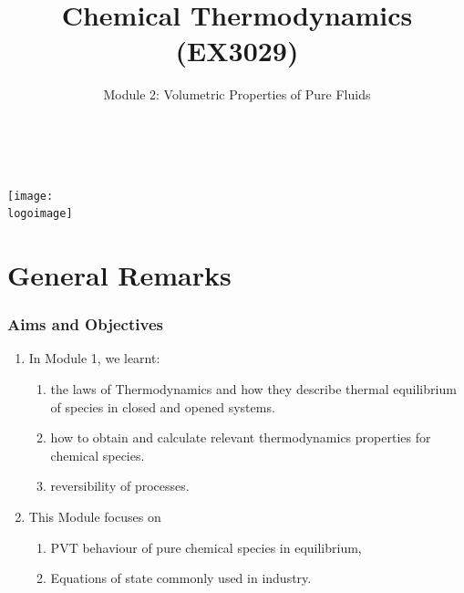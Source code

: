 \documentclass[10pt,compress]{beamer}
\institute{School of Engineering}
\title{Chemical Thermodynamics (EX3029)}
\subtitle{Module 2: Volumetric Properties of Pure Fluids}
\date[ ]{ }
\author[\shortname]{%
  \fullname\\\ttfamily{\emailaddress}
}
\newcommand{\logoimage}{../../FigBanner/UoAHorizBanner}
\begin{document}
\begin{frame}
  \titlepage
  \vfill%
  \begin{center}
    \texttt{[image: \\logoimage]}
  \end{center}
\end{frame}





\section{General Remarks}

\begin{frame}
 \frametitle{Aims and Objectives}
   \begin{enumerate}
     \item<1-> In Module 1, we learnt:
       \begin{enumerate}
         \item<1-> the laws of Thermodynamics and how they describe thermal equilibrium of species in closed and opened systems.
         \item<1-> how to obtain and calculate relevant thermodynamics properties for chemical species.
         \item<1-> reversibility  of processes.
       \end{enumerate} 
     \item<2-> This Module focuses on 
         \begin{enumerate}
           \item<2-> PVT behaviour of pure chemical species in equilibrium,
           \item<2-> Equations of state commonly used in industry.
         \end{enumerate}
   \end{enumerate}

\end{frame}


\end{document}
